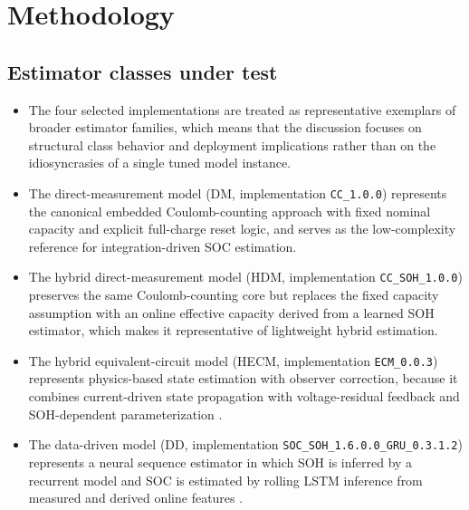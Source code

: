\documentclass[review,nopreprintline]{elsarticle}
\begin{document}
\section{Methodology}
\subsection{Estimator classes under test}
\begin{itemize}[leftmargin=*]
    \item The four selected implementations are treated as representative exemplars of broader estimator families, which means that the discussion focuses on structural class behavior and deployment implications rather than on the idiosyncrasies of a single tuned model instance.
    \item The direct-measurement model (DM, implementation \texttt{CC\_1.0.0}) represents the canonical embedded Coulomb-counting approach with fixed nominal capacity and explicit full-charge reset logic, and serves as the low-complexity reference for integration-driven SOC estimation.
    \item The hybrid direct-measurement model (HDM, implementation \texttt{CC\_SOH\_1.0.0}) preserves the same Coulomb-counting core but replaces the fixed capacity assumption with an online effective capacity derived from a learned SOH estimator, which makes it representative of lightweight hybrid estimation.
    \item The hybrid equivalent-circuit model (HECM, implementation \texttt{ECM\_0.0.3}) represents physics-based state estimation with observer correction, because it combines current-driven state propagation with voltage-residual feedback and SOH-dependent parameterization \cite{gaoEnhancedStateofchargeEstimation2022,guoSystematicReviewElectrochemical2024}.
    \item The data-driven model (DD, implementation \texttt{SOC\_SOH\_1.6.0.0\_GRU\_0.3.1.2}) represents a neural sequence estimator in which SOH is inferred by a recurrent model and SOC is estimated by rolling LSTM inference from measured and derived online features \cite{mondalEstimatingStateofChargeLithiumIon2024,yaoSmarterBatteryManagement2025b}.
\end{itemize}
\end{document}
